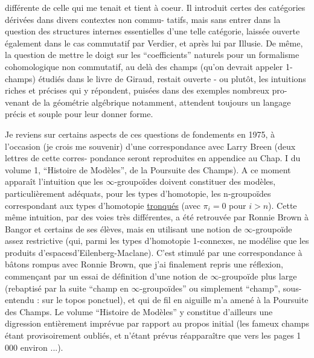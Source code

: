 
différente de celle qui me tenait et tient à coeur. Il introduit
certes des catégories dérivées dans divers contextes non commu-%
tatifs, mais sans entrer dans la question des structures internes
essentielles d'une telle catégorie, laissée ouverte également
dans le cas commutatif par Verdier, et après lui par Illusie. De
même, la question de mettre le doigt sur les ``coefficients''
naturels pour un formalisme cohomologique non commutatif, au delà
des champs (qu'on devrait appeler 1-champs) étudiés dans le livre
de Giraud, restait ouverte - ou plutôt, les intuitions riches et
précises qui y répondent, puisées dans des exemples nombreux pro-%
venant de la géométrie algébrique notamment, attendent toujours
un langage précis et souple pour leur donner forme.

Je reviens sur certains aspects de ces questions de
fondements en 1975, à l'occasion (je crois me souvenir) d'une
correspondance avec Larry Breen (deux lettres de cette corres-%
pondance seront reproduites en appendice au Chap. I du volume 1,
``Histoire de Modèles'', de la Poursuite des Champs). A ce moment
apparaît l'intuition que les $\infty$-groupoïdes doivent constituer des
modèles, particulièrement adéquats, pour les types d'homotopie,
les n-groupoïdes correspondant aux types d'homotopie \uline{tronqués}
(avec $\pi_i = 0$ pour $i > n$). Cette même intuition, par des voies
très différentes, a été retrouvée par Ronnie Brown à Bangor et
certains de ses élèves, mais en utilisant une notion de $\infty$-groupoïde
assez restrictive (qui, parmi les types d'homotopie 1-connexes,
ne modélise que les produits d'espacesd'Eilenberg-Maclane). C'est
stimulé par une correspondance à bâtons rompus avec Ronnie Brown,
que j'ai finalement repris une réflexion, commençant par un essai
de définition d'une notion de $\infty$-groupoïde plus large (rebaptisé
par la suite ``champ en $\infty$-groupoïdes'' ou simplement ``champ'', sous-%
entendu : sur le topos ponctuel), et qui de fil en aiguille m'a
amené à la Poursuite des Champs. Le volume ``Histoire de Modèles''
y constitue d'ailleurs une digression entièrement imprévue par
rapport au propos initial (les fameux champs étant provisoirement
oubliés, et n'étant prévus réapparaître que vers les pages 1 000
environ ...).

